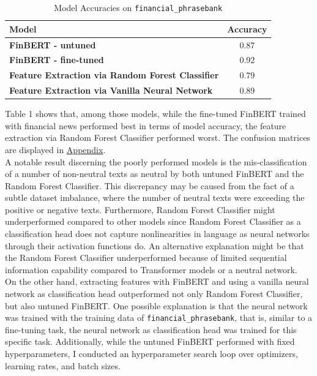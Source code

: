\documentclass{article}
\begin{document}
\begin{table}[htbp]
    \centering
    \begin{tabular}{>{\bfseries}l c} %
        \toprule
        Model & \textbf{Accuracy} \\
        \midrule[\heavyrulewidth]
        FinBERT - untuned & 0.87 \\
        FinBERT - fine-tuned & 0.92 \\
        Feature Extraction via Random Forest Classifier & 0.79 \\
        Feature Extraction via Vanilla Neural Network & 0.89 \\
        \bottomrule
    \end{tabular}
    \label{table:acc}
    \caption{Model Accuracies on \texttt{financial\_phrasebank}}
\end{table}

\noindent Table 1 shows that, among those models, while the fine-tuned FinBERT trained with financial news performed best in terms of model accuracy, the feature extraction via Random Forest Classifier performed worst. The confusion matrices are displayed in \hyperref[sec:appendix]{Appendix}. \\

\noindent A notable result discerning the poorly performed models is the mis-classification of a number of non-neutral texts as neutral by both untuned FinBERT and the Random Forest Classifier. This discrepancy may be caused from the fact of a subtle dataset imbalance, where the number of neutral texts were exceeding the positive or negative texts. Furthermore, Random Forest Classifier might underperformed compared to other models since Random Forest Classifier as a classification head does not capture nonlinearities in language as neural networks through their activation functions do. An alternative explanation might be that the Random Forest Classifier underperformed because of limited sequential information capability compared to Transformer models or a neutral network. \\

\noindent On the other hand, extracting features with FinBERT and using a vanilla neural network as classification head outperformed not only Random Forest Classifier, but also untuned FinBERT. One possible explanation is that the neural network was trained with the training data of \texttt{financial\_phrasebank}, that is, similar to a fine-tuning task, the neural network as classification head was trained for this specific task. Additionally, while the untuned FinBERT performed with fixed hyperparameters, I conducted an hyperparameter search loop over optimizers, learning rates, and batch sizes. \\
\end{document}
